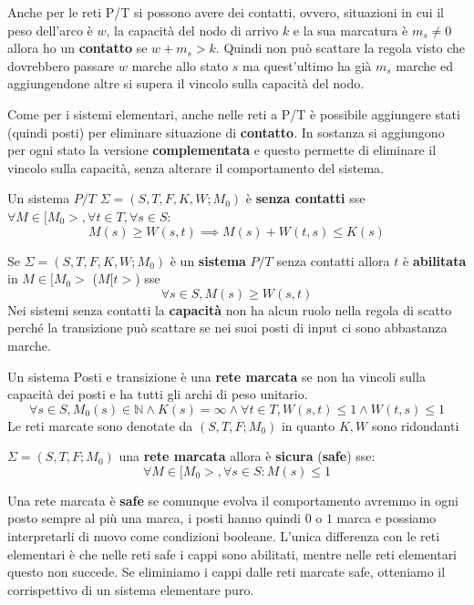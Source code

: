 Anche per le reti P/T si possono avere dei contatti, ovvero, situazioni in cui 
il peso dell'arco è $w$, la capacità del nodo di arrivo $k$ e la sua marcatura è
$m_s\ne 0$ allora ho un \textbf{contatto} se $w+m_s >k$. Quindi non può scattare
la regola visto che dovrebbero passare $w$ marche allo stato $s$ ma quest'ultimo
ha già $m_s$ marche ed aggiungendone altre si supera il vincolo sulla capacità 
del nodo.  

Come per i sistemi elementari, anche nelle reti a P/T è possibile aggiungere stati (quindi posti)
per eliminare situazione di \textbf{contatto}. In sostanza si aggiungono per ogni 
stato la versione \textbf{complementata} e questo permette di eliminare il vincolo sulla capacità,
senza alterare il comportamento del sistema.
\begin{definizione}
    Un sistema $P/T$ $\Sigma = (S,T,F,K,W;M_0)$ è \textbf{senza contatti} sse
    $\forall M\in [M_0>,\forall t\in T, \forall s\in S$:
    \begin{equation}
        M(s)\ge W(s,t)\implies M(s)+W(t,s)\le K(s)
    \end{equation}
\end{definizione}
Se $\Sigma = (S,T,F,K,W;M_0)$ è un \textbf{sistema} $P/T$ senza contatti allora
$t$ è \textbf{abilitata} in $M\in [M_0>$ ($M[t>$) sse
\begin{equation}
    \forall s\in S, M(s)\ge W(s,t)
\end{equation}
Nei sistemi senza contatti la \textbf{capacità} non ha alcun ruolo nella regola
di scatto perché la transizione può scattare se nei suoi posti di input ci sono
abbastanza marche.
\begin{definizione}
    Un sistema Posti e transizione è una \textbf{rete marcata} se non ha vincoli sulla
    capacità dei posti e ha tutti gli archi di peso unitario.
    \begin{equation}
        \forall s\in S, M_0(s)\in \mathbb{N}\land K(s)=\infty \land \forall t\in
        T, W(s,t)\le 1\land W(t,s)\le 1
    \end{equation}
    Le reti marcate sono denotate da $(S,T,F;M_0)$ in quanto $K,W$ sono ridondanti
\end{definizione}

\begin{definizione} 
    $\Sigma = (S,T,F;M_0)$ una \textbf{rete marcata} allora è \textbf{sicura}
    (\textbf{safe}) sse:
    \begin{equation}
        \forall M\in [M_0>,\forall s\in S:M(s)\le1
    \end{equation}
\end{definizione}
Una rete marcata è \textbf{safe} se comunque evolva il comportamento avremmo in
ogni posto sempre al più una marca, i posti hanno quindi $0$ o $1$ marca e possiamo
interpretarli di nuovo come condizioni booleane. L'unica differenza con le reti
elementari è che nelle reti safe i cappi sono abilitati, mentre nelle reti
elementari questo non succede. Se eliminiamo i cappi dalle reti marcate safe,
otteniamo il corrispettivo di un sistema elementare puro.

